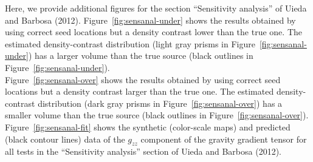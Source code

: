 \documentclass[twocolumn]{article}
\begin{document}
Here, we provide additional figures
for the section ``Sensitivity analysis''
of Uieda and Barbosa (2012).
Figure~\ref{fig:sensanal-under} shows
the results obtained by using correct seed locations
but a density contrast lower than the true one.
The estimated density-contrast distribution
(light gray prisms in Figure~\ref{fig:sensanal-under})
has a larger volume than the true source
(black outlines in Figure~\ref{fig:sensanal-under}).
\\
\indent
Figure~\ref{fig:sensanal-over} shows
the results obtained by using correct seed locations
but a density contrast larger than the true one.
The estimated density-contrast distribution
(dark gray prisms in Figure~\ref{fig:sensanal-over})
has a smaller volume than the true source
(black outlines in Figure~\ref{fig:sensanal-over}).
\\
\indent
Figure~\ref{fig:sensanal-fit} shows
the synthetic (color-scale maps) and
predicted (black contour lines) data
of the $g_{zz}$ component of the gravity gradient tensor
for all tests in the ``Sensitivity analysis'' section
of Uieda and Barbosa (2012).
\end{document}
